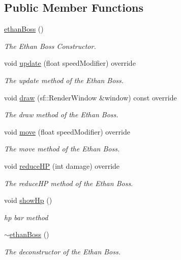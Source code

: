 \subsection*{Public Member Functions}
\begin{DoxyCompactItemize}
\item 
\hyperlink{classethan_boss_a140b89b74eb5da000a72487d04d5cc07}{ethan\+Boss} ()
\begin{DoxyCompactList}\small\item\em The Ethan Boss Constructor. \end{DoxyCompactList}\item 
void \hyperlink{classethan_boss_a6e47b12c5e718ecee5d888bcde580c1a}{update} (float speed\+Modifier) override
\begin{DoxyCompactList}\small\item\em The update method of the Ethan Boss. \end{DoxyCompactList}\item 
void \hyperlink{classethan_boss_af42458496295b946615a8d53277925f5}{draw} (sf\+::\+Render\+Window \&window) const override
\begin{DoxyCompactList}\small\item\em The draw method of the Ethan Boss. \end{DoxyCompactList}\item 
void \hyperlink{classethan_boss_a2797ae895a6a8954b071a181a9b425a9}{move} (float speed\+Modifier) override
\begin{DoxyCompactList}\small\item\em The move method of the Ethan Boss. \end{DoxyCompactList}\item 
void \hyperlink{classethan_boss_aba2f8a6fc46aae30ab5b59b4cc714d09}{reduce\+H\+P} (int damage) override
\begin{DoxyCompactList}\small\item\em The reduce\+H\+P method of the Ethan Boss. \end{DoxyCompactList}\item 
void \hyperlink{classethan_boss_ab8d1fc5061627ce993a18af115d78b2b}{show\+Hp} ()
\begin{DoxyCompactList}\small\item\em hp bar method \end{DoxyCompactList}\item 
\hyperlink{classethan_boss_a8f996ff4de55ee7842ef5a241ba0b838}{$\sim$ethan\+Boss} ()
\begin{DoxyCompactList}\small\item\em The deconstructor of the Ethan Boss. \end{DoxyCompactList}\end{DoxyCompactItemize}
